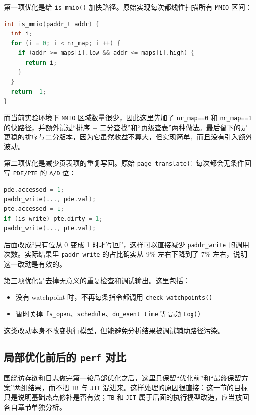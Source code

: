 \documentclass[a4paper]{article}
\begin{document}
第一项优化是给 \texttt{is\_mmio()} 加快路径。原始实现每次都线性扫描所有 \texttt{MMIO} 区间：

\begin{lstlisting}[language=C]
int is_mmio(paddr_t addr) {
  int i;
  for (i = 0; i < nr_map; i ++) {
    if (addr >= maps[i].low && addr <= maps[i].high) {
      return i;
    }
  }
  return -1;
}
\end{lstlisting}

而当前实验环境下 \texttt{MMIO} 区域数量很少，因此这里先加了 \texttt{nr\_map==0} 和 \texttt{nr\_map==1} 的快路径，并额外试过“排序 + 二分查找”和“页级查表”两种做法。最后留下的是更稳的排序与二分版本，因为它虽然收益不算大，但实现简单，而且没有引入额外波动。

第二项优化是减少页表项的重复写回。原始 \texttt{page\_translate()} 每次都会无条件回写 \texttt{PDE/PTE} 的 \texttt{A/D} 位：

\begin{lstlisting}[language=C]
pde.accessed = 1;
paddr_write(..., pde.val);
pte.accessed = 1;
if (is_write) pte.dirty = 1;
paddr_write(..., pte.val);
\end{lstlisting}

后面改成“只有位从 0 变成 1 时才写回”，这样可以直接减少 \texttt{paddr\_write} 的调用次数。实际结果里 \texttt{paddr\_write} 的占比确实从 9\% 左右下降到了 7\% 左右，说明这一改动是有效的。

第三项优化是去掉无意义的重复检查和调试输出。这里包括：

\begin{itemize}
  \item 没有 watchpoint 时，不再每条指令都调用 \texttt{check\_watchpoints()}
  \item 暂时关掉 \texttt{fs\_open}、\texttt{schedule}、\texttt{do\_event time} 等高频 \texttt{Log()}
\end{itemize}

这类改动本身不改变执行模型，但能避免分析结果被调试辅助路径污染。

\subsection{局部优化前后的 \texttt{perf} 对比}
围绕访存链和日志做完第一轮局部优化之后，这里只保留“优化前”和“最终保留方案”两组结果，而不把 \texttt{TB} 与 \texttt{JIT} 混进来。这样处理的原因很直接：这一节的目标只是说明基础热点修补是否有效；\texttt{TB} 和 \texttt{JIT} 属于后面的执行模型改造，应当放回各自章节单独分析。
\end{document}
